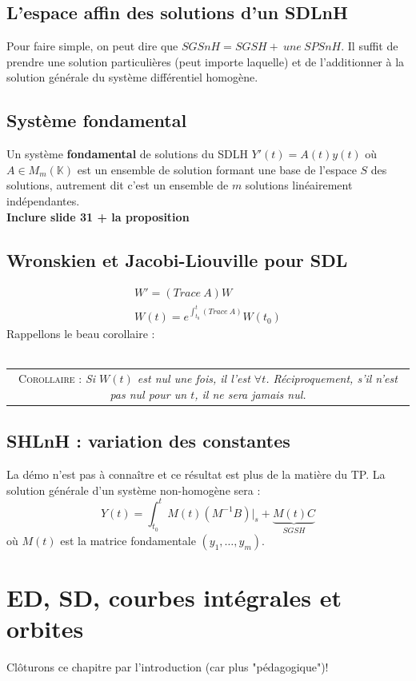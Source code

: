 \documentclass	[11pt, a4paper, openany]{book}
\newcommand{\corollaire}[1]{\ \\\begin{tabular}{|c}
\begin{minipage}{\textwidth}
  \textsc{Corollaire : } \textit{#1}
\end{minipage}
\end{tabular}}
\begin{document}
\subsection{L'espace affin des solutions d'un SDLnH}
Pour faire simple, on peut dire que $SGSnH = SGSH +\ une\ SPSnH$. Il suffit de prendre une solution particulières (peut importe laquelle) et de l'additionner à la solution générale du système différentiel homogène.

\subsection{Système fondamental}
Un système \textbf{fondamental} de solutions du SDLH $Y'(t) = A(t)y(t)$ où $A \in M_m(\mathbb{K})$ est un ensemble de solution formant une base de l'espace $S$ des solutions, autrement dit c'est un ensemble de $m$ solutions linéairement indépendantes.\\
\textbf{Inclure slide 31  + la proposition}

\subsection{Wronskien et Jacobi-Liouville pour SDL}
\begin{eqnarray}
W' = (Trace\ A)W\\
W(t) = e^{\int_{t_0}^t (Trace\ A)}W(t_0)
\end{eqnarray}
Rappellons le beau corollaire :\\
\corollaire{Si $W(t)$ est nul une fois, il l'est $\forall t$. Réciproquement, s'il n'est pas nul pour un $t$, il ne sera jamais nul.}

\subsection{SHLnH : variation des constantes}
La démo n'est pas à connaître et ce résultat est plus de la matière du TP. La solution générale d'un système non-homogène sera :
\begin{equation}
Y(t) = \int_{t_0}^t M(t)(M^{-1}B)|_s + \underbrace{M(t)C}_{SGSH}
\end{equation}
où $M(t)$ est la matrice fondamentale $(y_1,\dots,y_m)$.

\setcounter{section}{0}
\section{ED, SD, courbes intégrales et orbites}
Clôturons ce chapitre par l'introduction (car plus "pédagogique")! 
\end{document}
